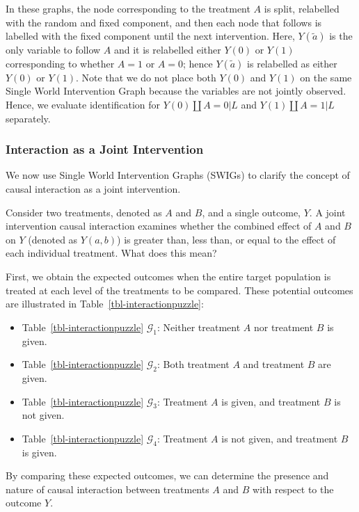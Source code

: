 \documentclass[
  single column]{article}
\providecommand{\tightlist}{%
  \setlength{\itemsep}{0pt}\setlength{\parskip}{0pt}}\usepackage{longtable,booktabs,array}
\begin{document}
In these graphs, the node corresponding to the treatment \(A\) is split,
relabelled with the random and fixed component, and then each node that
follows is labelled with the fixed component until the next
intervention. Here, \(Y(\tilde{a})\) is the only variable to follow
\(A\) and it is relabelled either \(Y(0)\) or \(Y(1)\) corresponding to
whether \(A=1\) or \(A=0\); hence \(Y(\tilde{a})\) is relabelled as
either \(Y(0)\) or \(Y(1)\). Note that we do not place both \(Y(0)\) and
\(Y(1)\) on the same Single World Intervention Graph because the
variables are not jointly observed. Hence, we evaluate identification
for \(Y(0)\coprod A = 0| L\) and \(Y(1)\coprod A = 1 | L\) separately.

\subsubsection{Interaction as a Joint
Intervention}\label{interaction-as-a-joint-intervention}

We now use Single World Intervention Graphs (SWIGs) to clarify the
concept of causal interaction as a joint intervention.

Consider two treatments, denoted as \(A\) and \(B\), and a single
outcome, \(Y\). A joint intervention causal interaction examines whether
the combined effect of \(A\) and \(B\) on \(Y\) (denoted as \(Y(a,b)\))
is greater than, less than, or equal to the effect of each individual
treatment. What does this mean?

First, we obtain the expected outcomes when the entire target population
is treated at each level of the treatments to be compared. These
potential outcomes are illustrated in Table~\ref{tbl-interactionpuzzle}:

\begin{itemize}
\tightlist
\item
  Table~\ref{tbl-interactionpuzzle} \(\mathcal{G}_1\): Neither treatment
  \(A\) nor treatment \(B\) is given.
\item
  Table~\ref{tbl-interactionpuzzle} \(\mathcal{G}_2\): Both treatment
  \(A\) and treatment \(B\) are given.
\item
  Table~\ref{tbl-interactionpuzzle} \(\mathcal{G}_3\): Treatment \(A\)
  is given, and treatment \(B\) is not given.
\item
  Table~\ref{tbl-interactionpuzzle} \(\mathcal{G}_4\): Treatment \(A\)
  is not given, and treatment \(B\) is given.
\end{itemize}

By comparing these expected outcomes, we can determine the presence and
nature of causal interaction between treatments \(A\) and \(B\) with
respect to the outcome \(Y\).
\end{document}
